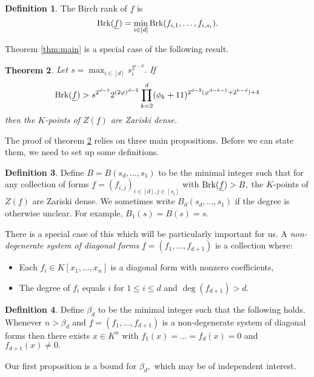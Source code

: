 \documentclass[12pt]{amsart}
\let\ul\underline
\newtheorem{theorem}{Theorem}[section]
\theoremstyle{definition}
\newtheorem{definition}[theorem]{Definition}
\newcommand{\brk}{\textnormal{Brk}}
\let\ul\underline
\begin{document}
\begin{definition}
    The Birch rank of $\ul{f}$ is 
    \[
    \brk(\ul{f}) = \min_{i\in [d]} \brk(f_{i,1},\ldots,f_{i,s_i}).
    \]
\end{definition}

 

Theorem \ref{thm:main} is a special case of the following result.

\begin{theorem}\label{thm:main-detailed}
    Let $s = \max_{i\in [d]} s_i^{2^{i-d}}.$ If 
    \[
    \brk(\ul{f}) > s^{2^{d-1}} 2^{(2\varphi)^{d-2}} \prod_{k=2}^d (\phi_k+11)^{2^{d-2}(\varphi^{d-k-1}+2^{k-d})+4}
    \]
    then the $K$-points of $Z(\ul{f})$ are Zariski dense.
\end{theorem}


The proof of theorem \ref{thm:main-detailed} relies on three main propositions. Before we can state them, we need to set up some definitions.

\begin{definition} 
Define $B = B(s_d,\ldots,s_1)$ to be the minimal integer such that for any collection of forms $\ul{f} = (f_{i,j})_{i\in [d],j\in [s_i]}$ with $\brk(\ul{f}) > B,$ the $K$-points of $Z(\ul{f})$ are Zariski dense.  We sometimes write $B_d(s_d,\ldots,s_1)$ if the degree is otherwise unclear. For example, $B_1(s) = B(s) = s.$ 
\end{definition}

There is a special case of this which will be particularly important for us. A \emph{non-degenerate system of diagonal forms} $\ul{f} = (f_1,\ldots,f_{d+1})$ is a collection where:
\begin{itemize}
    \item Each $f_i\in K[x_1,\ldots,x_n]$ is a diagonal form with nonzero coefficients,
    \item The degree of $f_i$ equals $i$ for $1\le i\le d$ and $\deg(f_{d+1}) > d.$ 
\end{itemize}
 

\begin{definition}
    Define $\beta_d$ to be the minimal integer such that the following holds. Whenever $n > \beta_d$ and $\ul{f} = (f_1,\ldots,f_{d+1})$ is a non-degenerate system of diagonal forms then there exists $x\in K^n$ with $f_1(x) = \ldots = f_d(x) = 0$ and $f_{d+1}(x)\neq 0.$
\end{definition}

Our first proposition is a bound for $\beta_d,$ which may be of independent interest.
\end{document}
